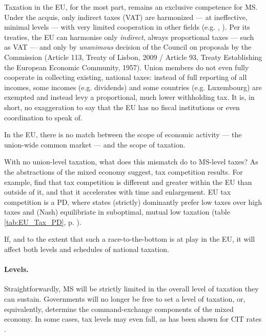 \documentclass[11pt,a4paper,oneside,openright]{article}
\begin{document}

Taxation in the \gls{EU}, for the most part, remains an exclusive competence for \gls{MS}. Under the acquis, only indirect taxes (VAT) are harmonized --- at ineffective, minimal levels --- with very limited cooperation in other fields (e.g. \citealt{EuropeanCommission2009}, \citealt{TaxCoordinationandTaxCompetitionintheEuropeanUnion-EvaluatingtheCodeofConductonBusinessTaxation2001}). 
Per its treaties, the \gls{EU} can harmonise only \emph{indirect}, always proportional taxes --- such as \gls{VAT} --- and only by \emph{unanimous} decision of the Council on proposals by the Commission (Article 113, Treaty of Lisbon, 2009 / Article 93, Treaty Establishing the European Economic Community, 1957). 
Union members do not even fully cooperate in collecting existing, national taxes: 
instead of full reporting of all incomes, some incomes (e.g. dividends) and some countries (e.g. Luxembourg) are exempted and instead levy a proportional, much lower withholding tax. 
It is, in short, no exaggeration to say that the \gls{EU} has no fiscal institutions or even coordination to speak of.

In the \gls{EU}, there is no match between the scope of economic activity --- the union-wide common market --- and the scope of taxation. 

With no union-level taxation, what does this mismatch do to 
\gls{MS}-level taxes? 
As the abstractions of the mixed economy suggest, tax competition results. 
For example, \cite{Genschel2009} find that tax competition is different and greater within the \gls{EU} than outside of it, and that it accelerates with time and enlargement. 
\gls{EU} tax competition is a \gls{PD}, where states (strictly) dominantly prefer low taxes over high taxes and (Nash) equilibriate in suboptimal, mutual low taxation (table \ref{tab:EU_Tax_PD}, p. \pageref{tab:EU_Tax_PD}).



If, and to the extent that such a race-to-the-bottom is at play in the \gls{EU}, it will affect both levels and schedules of national taxation.

\paragraph{Levels.} Straightforwardly, \gls{MS} will be strictly limited in the overall level of taxation they can sustain. 
Governments will no longer be free to set a level of taxation, or, equivalently, determine the command-exchange components of the mixed economy. 
In some cases, tax levels may even fall, as has been shown for \gls{CIT} rates \citep{Piatkowski2008}.
\end{document}
